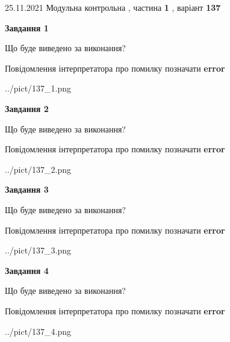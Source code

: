 \documentclass[10pt, ukrainian]{article}
\begin{document}
{25.11.2021 Модульна контрольна , частина \textbf { 1 }, варіант  \No \textbf { 137 }\par}
{
\begin {large}

{\begin {center}\textbf{Завдання 1}\end {center}}\par
Що буде виведено за виконання? \par
Повідомлення інтерпретатора про помилку позначати \textbf{error}

\begin{center}
	{../pict/137_1.png}
\end{center}
\newpage

{\begin {center}\textbf{Завдання 2}\end {center}}\par
Що буде виведено за виконання? \par
Повідомлення інтерпретатора про помилку позначати \textbf{error}

\begin{center}
	{../pict/137_2.png}
\end{center}
\newpage

{\begin {center}\textbf{Завдання 3}\end {center}}\par
Що буде виведено за виконання? \par
Повідомлення інтерпретатора про помилку позначати \textbf{error}

\begin{center}
	{../pict/137_3.png}
\end{center}
\newpage

{\begin {center}\textbf{Завдання 4}\end {center}}\par
Що буде виведено за виконання? \par
Повідомлення інтерпретатора про помилку позначати \textbf{error}

\begin{center}
	{../pict/137_4.png}
\end{center}
\newpage


\end{large}}
\end{document}
